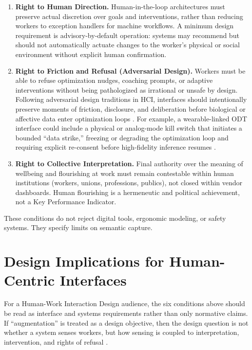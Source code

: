 \documentclass[runningheads]{llncs}
\begin{document}
\begin{enumerate}
\item \textbf{Right to Human Direction.} Human-in-the-loop architectures must preserve actual discretion over goals and interventions, rather than reducing workers to exception handlers for machine workflows. A minimum design requirement is advisory-by-default operation: systems may recommend but should not automatically actuate changes to the worker's physical or social environment without explicit human confirmation.

\item \textbf{Right to Friction and Refusal (Adversarial Design).} Workers must be able to refuse optimization nudges, coaching prompts, or adaptive interventions without being pathologized as irrational or unsafe by design. Following adversarial design traditions in HCI, interfaces should intentionally preserve moments of friction, disclosure, and deliberation before biological or affective data enter optimization loops \cite{disalvo2012adversarial}. For example, a wearable-linked ODT interface could include a physical or analog-mode kill switch that initiates a bounded ``data strike,'' freezing or degrading the optimization loop and requiring explicit re-consent before high-fidelity inference resumes \cite{nissenbaum2015obfuscation}.

\item \textbf{Right to Collective Interpretation.} Final authority over the meaning of wellbeing and flourishing at work must remain contestable within human institutions (workers, unions, professions, publics), not closed within vendor dashboards. Human flourishing is a hermeneutic and political achievement, not a Key Performance Indicator.
\end{enumerate}

These conditions do not reject digital tools, ergonomic modeling, or safety systems. They specify limits on semantic capture.

\section{Design Implications for Human-Centric Interfaces}

For a Human-Work Interaction Design audience, the six conditions above should be read as interface and systems requirements rather than only normative claims. If ``augmentation'' is treated as a design objective, then the design question is not whether a system senses workers, but how sensing is coupled to interpretation, intervention, and rights of refusal \cite{hwid2026cfp}.
\end{document}
